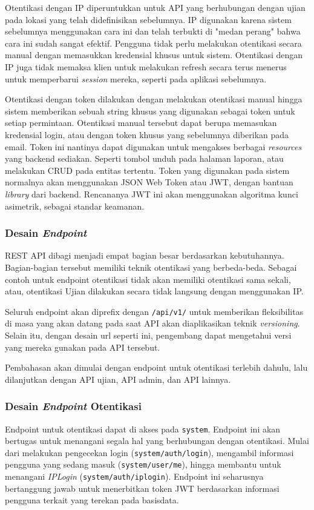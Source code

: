     Otentikasi dengan IP diperuntukkan untuk API yang berhubungan dengan ujian pada lokasi yang telah
    didefinisikan sebelumnya. IP digunakan karena sistem sebelumnya menggunakan cara ini dan telah
    terbukti di "medan perang" bahwa cara ini sudah sangat efektif. Pengguna tidak perlu melakukan
    otentikasi secara manual dengan memasukkan kredensial khusus untuk sistem. Otentikasi dengan IP
    juga tidak memaksa klien untuk melakukan refresh secara terus menerus untuk memperbarui 
    \textit{session} mereka, seperti pada aplikasi sebelumnya.
    
    Otentikasi dengan token dilakukan dengan melakukan otentikasi manual hingga sistem memberikan
    sebuah string khusus yang digunakan sebagai token untuk setiap permintaan. Otentikasi
    manual tersebut dapat berupa memasukan kredensial login, atau dengan token khusus yang sebelumnya
    diberikan pada email. Token ini nantinya dapat digunakan untuk mengakses berbagai 
    \textit{resources} yang backend sediakan. Seperti tombol unduh pada halaman laporan, atau
    melakukan CRUD pada entitas tertentu.
    Token yang digunakan pada sistem normalnya akan menggunakan JSON Web Token atau JWT, dengan bantuan 
    \textit{library} dari backend. Rencananya JWT ini akan menggunakan algoritma kunci asimetrik,
    sebagai standar keamanan.
    
\subsubsection{Desain \textit{Endpoint}}
    REST API dibagi menjadi empat bagian besar berdasarkan kebutuhannya. Bagian-bagian tersebut
    memiliki teknik otentikasi yang berbeda-beda. Sebagai contoh untuk endpoint otentikasi
    tidak akan memiliki otentikasi sama sekali, atau, otentikasi Ujian dilakukan secara tidak
    langsung dengan menggunakan IP. 
    
    Seluruh endpoint akan diprefix dengan \texttt{/api/v1/} untuk memberikan fleksibilitas di masa
    yang akan datang pada saat API akan diaplikasikan teknik \textit{versioning}. Selain itu,
    dengan desain url seperti ini, pengembang dapat mengetahui versi yang mereka gunakan pada
    API tersebut.
    
    Pembahasan akan dimulai dengan endpoint untuk otentikasi
    terlebih dahulu, lalu dilanjutkan dengan API ujian, API admin, dan API lainnya.
    
\subsubsection{Desain \textit{Endpoint} Otentikasi}
    Endpoint untuk otentikasi dapat di akses pada \texttt{system}. Endpoint ini akan bertugas untuk
    menangani segala hal yang berhubungan dengan otentikasi. Mulai dari melakukan pengecekan
    login (\texttt{system/auth/login}), mengambil informasi pengguna yang sedang masuk 
    (\texttt{system/user/me}), hingga membantu untuk menangani 
    \textit{IPLogin} (\texttt{system/auth/iplogin}). 
    Endpoint ini seharusnya bertanggung jawab untuk menerbitkan token JWT
    berdasarkan informasi pengguna terkait yang terekan pada basisdata.
    
